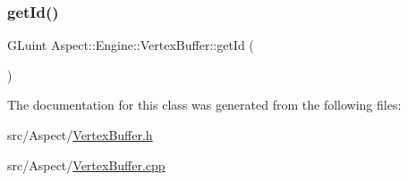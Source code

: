 \mbox{\label{class_aspect_1_1_engine_1_1_vertex_buffer_a5550514e2062b822cd6808662bc126b5}} 
\subsubsection{\texorpdfstring{get\+Id()}{getId()}}
{\footnotesize\ttfamily G\+Luint Aspect\+::\+Engine\+::\+Vertex\+Buffer\+::get\+Id (\begin{DoxyParamCaption}{ }\end{DoxyParamCaption})}



The documentation for this class was generated from the following files\+:\begin{DoxyCompactItemize}
\item 
src/\+Aspect/\mbox{\hyperlink{_vertex_buffer_8h}{Vertex\+Buffer.\+h}}\item 
src/\+Aspect/\mbox{\hyperlink{_vertex_buffer_8cpp}{Vertex\+Buffer.\+cpp}}\end{DoxyCompactItemize}
